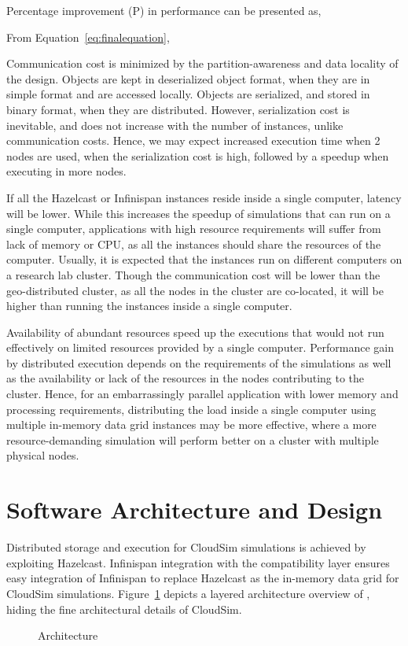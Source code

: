 Percentage improvement (P) in performance can be presented as,


From Equation~\ref{eq:finalequation},



Communication cost is minimized by the partition-awareness and data locality of the design. Objects are kept in deserialized object format, when they are in simple format and are accessed locally. Objects are serialized, and stored in binary format, when they are distributed. However, serialization cost is inevitable, and does not increase with the number of instances, unlike communication costs. Hence, we may expect increased execution time when 2 nodes are used, when the serialization cost is high, followed by a speedup when executing in more nodes.

If all the Hazelcast or Infinispan instances reside inside a single computer, latency will be lower. While this increases the speedup of simulations that can run on a single computer, applications with high resource requirements will suffer from lack of memory or CPU, as all the instances should share the resources of the computer. Usually, it is expected that the instances run on different computers on a research lab cluster. Though the communication cost will be lower than the geo-distributed cluster, as all the nodes in the cluster are co-located, it will be higher than running the instances inside a single computer. 

Availability of abundant resources speed up the executions that would not run effectively on limited resources provided by a single computer. Performance gain by distributed execution  depends on the requirements of the simulations as well as the availability or lack of the resources in the nodes contributing to the cluster. Hence, for an embarrassingly parallel application with lower memory and processing requirements, distributing the load inside a single computer using multiple in-memory data grid instances may be more effective, where a more resource-demanding simulation will perform better on a cluster with multiple physical nodes.

\section{Software Architecture and Design}
\label{sec:3arch}
Distributed storage and execution for CloudSim simulations is achieved by exploiting Hazelcast. Infinispan integration with the compatibility layer ensures easy integration of Infinispan to replace Hazelcast as the in-memory data grid for CloudSim simulations. Figure~\ref{fig:cloud2simArch} depicts a layered architecture overview of , hiding the fine architectural details of CloudSim. 
\begin{figure}[!h]
\begin{center}
\end{center}

 \caption{ Architecture}
 \label{fig:cloud2simArch}
\end{figure}

